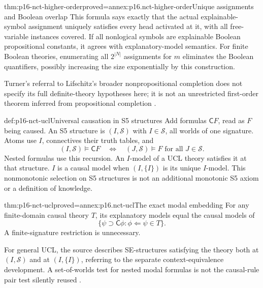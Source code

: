 \begin{hbtheorem}{thm:p16-nct-higher-order}{proved=annex:p16.nct-higher-order}{Unique assignments and Boolean overlap}
This formula says exactly that the actual explainable-symbol assignment
uniquely satisfies every head activated at it, with all free-variable
instances covered.
If all nonlogical symbols are explainable Boolean propositional constants,
it agrees with explanatory-model semantics.
For finite Boolean theories, enumerating all \(2^{|N|}\) assignments for
\(m\) eliminates the Boolean quantifiers, possibly increasing the size
exponentially by this construction.
\end{hbtheorem}

Turner's referral to Lifschitz's broader nonpropositional completion
does not specify its full definite-theory hypotheses here; it is not
an unrestricted first-order theorem inferred from propositional completion
\cite[pp.~772--773]{Turner2008NonmonotonicCausalLogic}.

\begin{hbdefinition}{def:p16-nct-ucl}{Universal causation in S5 structures}
Add formulas \(\mathsf C F\), read as \(F\) being caused.
An S5 structure is \((I,\mathcal S)\) with \(I\in\mathcal S\), all worlds
of one signature. Atoms use \(I\), connectives their truth tables, and
\[
 (I,\mathcal S)\models\mathsf C F
   \quad\Longleftrightarrow\quad
 (J,\mathcal S)\models F\text{ for all }J\in\mathcal S.
\]
Nested formulas use this recursion. An \(I\)-model of a UCL theory satisfies
it at that structure. \(I\) is a causal model when \((I,\{I\})\) is its
unique \(I\)-model. This nonmonotonic selection on S5 structures is
not an additional monotonic S5 axiom or a definition of knowledge.
\end{hbdefinition}

\begin{hbtheorem}{thm:p16-nct-ucl}{proved=annex:p16.nct-ucl}{The exact modal embedding}
For any finite-domain causal theory \(T\), its explanatory models equal
the causal models of
\[
                       \{\psi\supset\mathsf C\phi:
                                         \phi\Leftarrow\psi\in T\}.
\]
A finite-signature restriction is unnecessary.
\end{hbtheorem}

For general UCL, the source describes SE-structures satisfying the theory
both at \((I,\mathcal S)\) and at \((I,\{I\})\), referring to the separate
context-equivalence development. A set-of-worlds test for nested modal
formulas is not the causal-rule pair test silently reused
\cite[pp.~773--774]{Turner2008NonmonotonicCausalLogic}.

